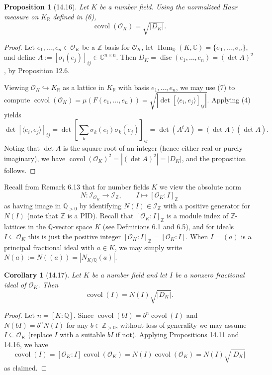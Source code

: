 \documentclass[UTF8,11pt]{ctexart}
\newtheorem*{proposition}{Proposition}
\newtheorem*{corollary}{Corollary}
\newcommand{\Hom}{\operatorname{Hom}}
\newcommand{\covol}{\operatorname{covol}}
\begin{document}
\begin{proposition}[14.16]
Let $K$ be a number field. Using the normalized Haar measure on $K_{\mathbb R}$ defined in (6),
\[
\covol(\mathcal O_K)=\sqrt{|D_K|}.
\]
\end{proposition}
\begin{proof}
Let $e_1,\ldots,e_n\in\mathcal O_K$ be a $\mathbb Z$-basis for $\mathcal O_K$, let $\Hom_{\mathbb Q}(K,\mathbb C)=\{\sigma_1,\ldots,\sigma_n\}$, and define $A:=[\sigma_i(e_j)]_{ij}\in\mathbb C^{n\times n}$. Then $D_K=\operatorname{disc}(e_1,\ldots,e_n)=(\det A)^2$, by Proposition 12.6.

Viewing $\mathcal O_K\hookrightarrow K_{\mathbb R}$ as a lattice in $K_{\mathbb R}$ with basis $e_1,\ldots,e_n$, we may use (7) to compute $\covol(\mathcal O_K)=\mu(F(e_1,\ldots,e_n))=\sqrt{|\det[\langle e_i,e_j\rangle]_{ij}|}$. Applying (4) yields
\[
\det[\langle e_i,e_j\rangle]_{ij}
=\det\left[\sum_k\sigma_k(e_i)\overline{\sigma_k(e_j)}\right]_{ij}
=\det(A^t\overline A)=(\det A)(\overline{\det A}).
\]
Noting that $\det A$ is the square root of an integer (hence either real or purely imaginary), we have $\covol(\mathcal O_K)^2=|(\det A)^2|=|D_K|$, and the proposition follows.
\end{proof}

Recall from Remark 6.13 that for number fields $K$ we view the absolute norm
\[
N:\mathcal I_{\mathcal O_K}\longrightarrow\mathcal I_{\mathbb Z},\qquad
I\longmapsto[\mathcal O_K:I]_{\mathbb Z}
\]
as having image in $\mathbb Q_{>0}$ by identifying $N(I)\in\mathcal I_{\mathbb Z}$ with a positive generator for $N(I)$ (note that $\mathbb Z$ is a PID). Recall that $[\mathcal O_K:I]_{\mathbb Z}$ is a module index of $\mathbb Z$-lattices in the $\mathbb Q$-vector space $K$ (see Definitions 6.1 and 6.5), and for ideals $I\subseteq\mathcal O_K$ this is just the positive integer $[\mathcal O_K:I]_{\mathbb Z}=[\mathcal O_K:I]$. When $I=(a)$ is a principal fractional ideal with $a\in K$, we may simply write $N(a):=N((a))=|N_{K/\mathbb Q}(a)|$.

\begin{corollary}[14.17]
Let $K$ be a number field and let $I$ be a nonzero fractional ideal of $\mathcal O_K$. Then
\[
\covol(I)=N(I)\sqrt{|D_K|}.
\]
\end{corollary}
\begin{proof}
Let $n=[K:\mathbb Q]$. Since $\covol(bI)=b^n\covol(I)$ and $N(bI)=b^nN(I)$ for any $b\in\mathbb Z_{>0}$, without loss of generality we may assume $I\subseteq\mathcal O_K$ (replace $I$ with a suitable $bI$ if not). Applying Propositions 14.11 and 14.16, we have
\[
\covol(I)=[\mathcal O_K:I]\covol(\mathcal O_K)=N(I)\covol(\mathcal O_K)=N(I)\sqrt{|D_K|}
\]
as claimed.
\end{proof}
\end{document}
